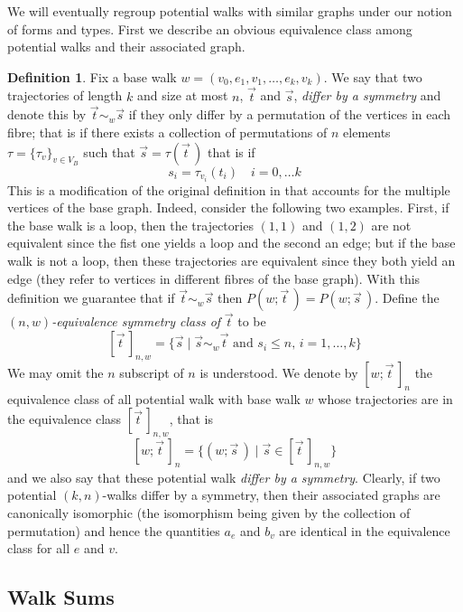 \documentclass{memo-l}
\theoremstyle{plain}
\theoremstyle{definition}
\numberwithin{section}{chapter}
\numberwithin{equation}{chapter}
\newcommand{\potwalk}{(w;\vec t\,)}
\newcommand{\potwalkclass}{[w;\vec t\,]_n}
\theoremstyle{plain}
\theoremstyle{definition}
\newtheorem{defn}[theorem]{Definition}
\begin{document}
We will eventually regroup potential walks with similar graphs under our
notion of forms and types. First we describe an obvious equivalence class
among potential walks and their associated graph.

\begin{defn} Fix a base walk \( w = (v_0, e_1, v_1, \ldots, e_k,v_k) \). We
say that two trajectories of length \(k\) and size at most \(n\), \( \vec t
\) and \( \vec s \), \emph{differ by a symmetry} and denote this by \( \vec
t \sim_w \vec s \) if they only differ by a permutation of the vertices in
each fibre; that is if there exists a collection of permutations of \(n\)
elements \( \tau = \{ \tau_v \}_{v \in V_B} \) such that \( \vec s =
\tau(\vec t\,) \) that is if \[ s_i = \tau_{v_i}(t_i) \quad i=0, \ldots k
\] This is a modification of the original definition in
\cite{friedman_alon} that accounts for the multiple vertices of the base
graph. Indeed, consider the following two examples. First, if the base walk
is a loop, then the trajectories \( (1,1) \) and \( (1,2) \) are not
equivalent since the fist one yields a loop and the second an edge; but if
the base walk is not a loop, then these trajectories are equivalent since
they both yield an edge (they refer to vertices in different fibres of the
base graph). With this definition we guarantee that if \( \vec t \sim_w
\vec s \) then \( P\potwalk = P(w;\vec s\,) \). Define the \( (n,w)
\)\emph{-equivalence symmetry class of} \( \vec t \) to
be \[ [\vec t\,]_{n,w} = \{ \vec s \mid \vec s \sim_w
\vec t \text{ and } s_i \leq n, \, i=1,\ldots,k \} \] We may omit the \(n\)
subscript of \(n\) is understood. We denote by \( \potwalkclass  \) the
equivalence class of all potential walk with base walk \(w\) whose
trajectories are in the equivalence class \( [\vec t\,]_{n,w} \), that
is \[ \potwalkclass = \{ (w; \vec s\,) \mid
\vec s \in [\vec t\,]_{n,w} \} \] and we also say that these potential walk
\emph{differ by a symmetry}. Clearly, if two potential \((k,n)\)-walks
differ by a symmetry, then their associated graphs are canonically
isomorphic (the isomorphism being given by the collection of permutation)
and hence the quantities \(a_e\) and \( b_v \) are identical in the
equivalence class for all \(e\) and \(v\).  \end{defn}
%
%
%
%
\subsection{Walk Sums}
\end{document}
